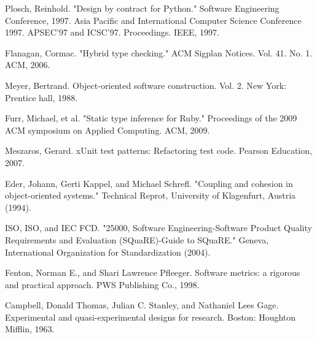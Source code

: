\documentclass[preprint]{sigplanconf}
\begin{document}
\begin{thebibliography}{}
Plosch, Reinhold. "Design by contract for Python." Software Engineering Conference, 1997. Asia Pacific and International Computer Science Conference 1997. APSEC'97 and ICSC'97. Proceedings. IEEE, 1997.

Flanagan, Cormac. "Hybrid type checking." ACM Sigplan Notices. Vol. 41. No. 1. ACM, 2006.

Meyer, Bertrand. Object-oriented software construction. Vol. 2. New York: Prentice hall, 1988.

Furr, Michael, et al. "Static type inference for Ruby." Proceedings of the 2009 ACM symposium on Applied Computing. ACM, 2009.

Meszaros, Gerard. xUnit test patterns: Refactoring test code. Pearson Education, 2007.

Eder, Johann, Gerti Kappel, and Michael Schrefl. "Coupling and cohesion in object-oriented systems." Technical Reprot, University of Klagenfurt, Austria (1994).

ISO, ISO, and IEC FCD. "25000, Software Engineering-Software Product Quality Requirements and Evaluation (SQuaRE)-Guide to SQuaRE." Geneva, International Organization for Standardization (2004).

Fenton, Norman E., and Shari Lawrence Pfleeger. Software metrics: a rigorous and practical approach. PWS Publishing Co., 1998.

Campbell, Donald Thomas, Julian C. Stanley, and Nathaniel Lees Gage. Experimental and quasi-experimental designs for research. Boston: Houghton Mifflin, 1963.

\end{thebibliography}
\end{document}
